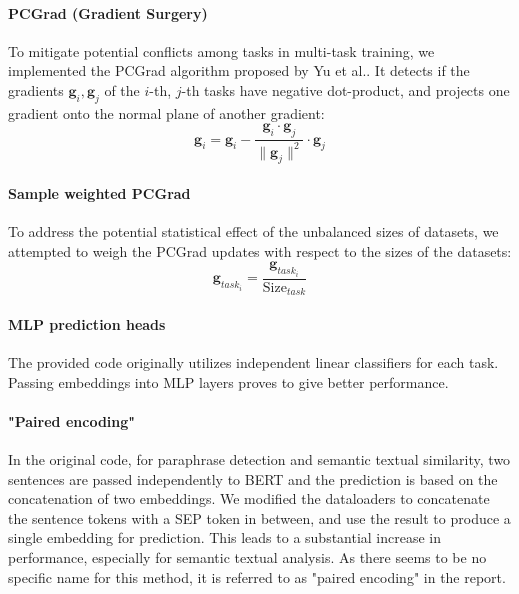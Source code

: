 \documentclass{article}
\begin{document}
    \paragraph{PCGrad (Gradient Surgery)}
      To mitigate potential conflicts among tasks in multi-task training, we implemented the PCGrad algorithm proposed by Yu et al.\cite{yu2020gradient}.
      It detects if the gradients $\mathbf{g}_i, \mathbf{g}_j$ of the $i$-th, $j$-th tasks have negative dot-product,
      and projects one gradient onto the normal plane of another gradient:
      \begin{equation}
        \mathbf{g}_i = \mathbf{g}_i - \frac{\mathbf{g}_i \cdot \mathbf{g}_j}{\lVert \mathbf{g}_j \rVert^2} \cdot \mathbf{g}_j
      \end{equation}

    \paragraph{Sample weighted PCGrad}
      To address the potential statistical effect of the unbalanced sizes of datasets, we attempted to weigh the PCGrad updates with respect to the sizes of the datasets:
      \begin{equation}
        \mathbf{g}_{task_i} = \frac{\mathbf{g}_{task_i}}{\mathrm{Size}_{task}}
      \end{equation}


    \paragraph{MLP prediction heads}
      The provided code originally utilizes independent linear classifiers for each task.
      Passing embeddings into MLP layers proves to give better performance.

    \paragraph{"Paired encoding"}
      In the original code, for paraphrase detection and semantic textual similarity, two sentences are passed independently to BERT and the prediction is based on the concatenation of two embeddings.
      We modified the dataloaders to concatenate the sentence tokens with a SEP token in between, and use the result to produce a single embedding for prediction\cite{devlin2019bert}.
      This leads to a substantial increase in performance, especially for semantic textual analysis. As there seems to be no specific name for this method, it is referred to as "paired encoding" in the report.
\end{document}
